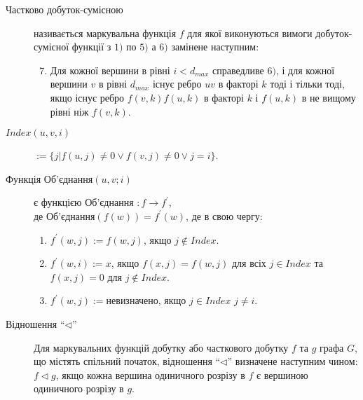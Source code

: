 \begin{description}
\begin{enumerate}
  \end{enumerate}
  \item[Частково добуток-сумісною] називається маркувальна функція $f$ для якої виконуються вимоги добуток-сумісної функції з $1)$ по $5)$ а $6)$ замінене наступним:
    \begin{enumerate}
      \setcounter{enumi}{6}
      \item Для кожної вершини в рівні $i < d_{max}$ справедливе $6)$, і для кожної вершини $v$ в рівні $d_{max}$ існує ребро $uv$ в факторі $k$ тоді і тільки тоді, якщо існує ребро $f(v,k)f(u,k)$ в факторі $k$ і $f(u,k)$ в не вищому рівні ніж $f(v,k)$.
    \end{enumerate}
    \item[$Index(u,v,i)$] $:=\lbrace j \vert f(u,j) \ne 0 \lor f(v,j) \ne 0 \lor j = i \rbrace$.
    \item[Функція Об'єднання$(u,v;i)$] є функцією Об'єднання $: f \to f^\prime$,\\
      де Об'єднання$(f(w))=f^\prime(w)$, де в свою чергу:
      \begin{enumerate}
        \item $f^\prime(w,j):=f(w,j)$, якщо $j \not\in Index$.
        \item $f^\prime(w,i):=x$, якщо $f(x,j)=f(w,j)$ для всіх $j \in Index$ та $f(x,j) = 0$ для $j \not\in Index$.
        \item $f^\prime(w,j):=$невизначено, якщо $j \in Index$ $j \ne i$.
      \end{enumerate}
      \item[Відношення ``$\triangleleft$''] Для маркувальних функцій добутку або часткового добутку $f$ та $g$ графа $G$, що містять спільний початок, відношення ``$\triangleleft$'' визначене наступним чином: $f \triangleleft g$, якщо кожна вершина одиничного розрізу в $f$ є вершиною одиничного розрізу в $g$.
\end{description}
